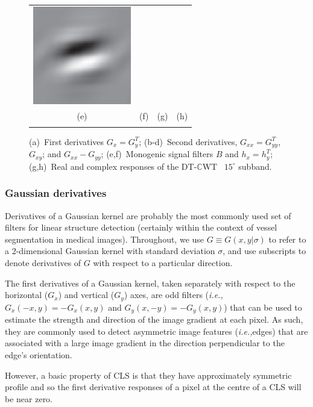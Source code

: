 \documentclass{IEEEtran}
\def\ie{\emph{i.e.,}}
\def\Gx{G_x}
\def\Gy{G_y}
\def\Gxx{G_{xx}}
\def\Gxy{G_{xy}}
\def\Gyy{G_{yy}}
\def\dtcwt{DT-$\mathbb{C}$WT}
\begin{document}
\begin{figure}[t]
\begin{tabular}{@{}c c c c@{}}
\includegraphics[width=0.2\columnwidth]{figs/filtering/dt_cwt_c4} \\
(e) & (f) & (g) & (h) \\
\noalign{\smallskip}
\end{tabular}
%
\caption{(a)~First derivatives $\Gx = \Gy^T$; (b-d)~Second derivatives, $\Gxx = \Gyy^T$, $\Gxy$; and $\Gxx-\Gyy$; (e,f)~Monogenic signal filters $B$ and $h_x = h_y^T$; (g,h)~Real and complex responses of the \dtcwt~ $15^\circ$ subband.}
\label{f:filters}
\end{figure}

\subsubsection{Gaussian derivatives}
\label{s:filtering_secondderivs}
%
Derivatives of a Gaussian kernel are probably the most commonly used set of filters for linear structure detection (certainly within the context of vessel segmentation in medical images). Throughout, we use $G \equiv G(x,y|\sigma)$ to refer to a 2-dimensional Gaussian kernel with standard deviation $\sigma$, and use subscripts to denote derivatives of $G$ with respect to a particular direction.

The first derivatives of a Gaussian kernel, taken separately with respect to the horizontal ($G_x$) and vertical ($G_y$) axes, are odd filters (\ie $G_x(-x,y) = -G_x(x,y)$ and $G_y(x,-y)=-G_y(x,y)$) that can be used to estimate the strength and direction of the image gradient at each pixel. As such, they are commonly used to detect asymmetric image features (\ie edges) that are associated with a large image gradient in the direction perpendicular to the edge's orientation.

However, a basic property of CLS is that they have approximately symmetric profile and so the first derivative responses of a pixel at the centre of a CLS will be near zero.
\end{document}
